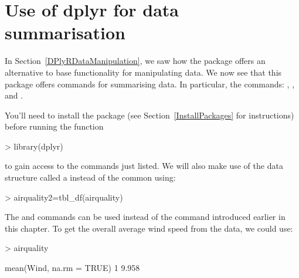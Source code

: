  
 
 
 
\section{Use of dplyr for data summarisation} 
\label{DPlyRDataSummarisation} 
 
 
In Section~\ref{DPlyRDataManipulation}, we saw how the  package offers an alternative to base \R{} functionality for manipulating data. We now see that this package offers commands for summarising data. In particular, the commands: , , and . 
   
You'll need to install the package (see Section~\ref{InstallPackages} for instructions) before running the function 

\begin{Schunk}
\begin{Sinput}
> library(dplyr) 
\end{Sinput}
\end{Schunk}

to gain access to the commands just listed. We will also make use of the  data structure called a  instead of the common  using: 

\begin{Schunk}
\begin{Sinput}
> airquality2=tbl_df(airquality) 
\end{Sinput}
\end{Schunk}

 
 
The   and  commands can be used instead of the  command introduced earlier in this chapter. To get the overall average wind speed from the  data, we could use: 

\begin{Schunk}
\begin{Sinput}
> airquality %>% summarise(mean(Wind, na.rm = TRUE)) 
\end{Sinput}
\begin{Soutput}
  mean(Wind, na.rm = TRUE)
1                    9.958
\end{Soutput}
\end{Schunk}


